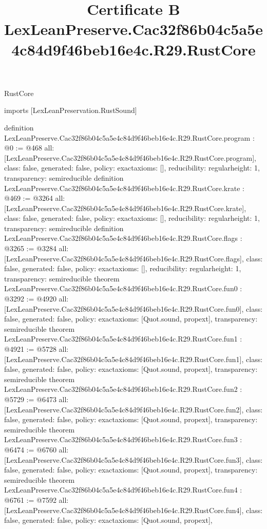 \begin{lexlean}{RustCore}
\title{Certificate B LexLeanPreserve.Cac32f86b04c5a5e4c84d9f46beb16e4c.R29.RustCore}
\begin{coremodule}
imports [LexLeanPreservation.RustSound]

definition LexLeanPreserve.Cac32f86b04c5a5e4c84d9f46beb16e4c.R29.RustCore.program : @0 := @468 {
  all: [LexLeanPreserve.Cac32f86b04c5a5e4c84d9f46beb16e4c.R29.RustCore.program],
  class: false,
  generated: false,
  policy: exact{axioms: []},
  reducibility: regular{height: 1},
  transparency: semireducible
}
definition LexLeanPreserve.Cac32f86b04c5a5e4c84d9f46beb16e4c.R29.RustCore.krate : @469 := @3264 {
  all: [LexLeanPreserve.Cac32f86b04c5a5e4c84d9f46beb16e4c.R29.RustCore.krate],
  class: false,
  generated: false,
  policy: exact{axioms: []},
  reducibility: regular{height: 1},
  transparency: semireducible
}
definition LexLeanPreserve.Cac32f86b04c5a5e4c84d9f46beb16e4c.R29.RustCore.flags : @3265 := @3284 {
  all: [LexLeanPreserve.Cac32f86b04c5a5e4c84d9f46beb16e4c.R29.RustCore.flags],
  class: false,
  generated: false,
  policy: exact{axioms: []},
  reducibility: regular{height: 1},
  transparency: semireducible
}
theorem LexLeanPreserve.Cac32f86b04c5a5e4c84d9f46beb16e4c.R29.RustCore.fun0 : @3292 := @4920 {
  all: [LexLeanPreserve.Cac32f86b04c5a5e4c84d9f46beb16e4c.R29.RustCore.fun0],
  class: false,
  generated: false,
  policy: exact{axioms: [Quot.sound, propext]},
  transparency: semireducible
}
theorem LexLeanPreserve.Cac32f86b04c5a5e4c84d9f46beb16e4c.R29.RustCore.fun1 : @4921 := @5728 {
  all: [LexLeanPreserve.Cac32f86b04c5a5e4c84d9f46beb16e4c.R29.RustCore.fun1],
  class: false,
  generated: false,
  policy: exact{axioms: [Quot.sound, propext]},
  transparency: semireducible
}
theorem LexLeanPreserve.Cac32f86b04c5a5e4c84d9f46beb16e4c.R29.RustCore.fun2 : @5729 := @6473 {
  all: [LexLeanPreserve.Cac32f86b04c5a5e4c84d9f46beb16e4c.R29.RustCore.fun2],
  class: false,
  generated: false,
  policy: exact{axioms: [Quot.sound, propext]},
  transparency: semireducible
}
theorem LexLeanPreserve.Cac32f86b04c5a5e4c84d9f46beb16e4c.R29.RustCore.fun3 : @6474 := @6760 {
  all: [LexLeanPreserve.Cac32f86b04c5a5e4c84d9f46beb16e4c.R29.RustCore.fun3],
  class: false,
  generated: false,
  policy: exact{axioms: [Quot.sound, propext]},
  transparency: semireducible
}
theorem LexLeanPreserve.Cac32f86b04c5a5e4c84d9f46beb16e4c.R29.RustCore.fun4 : @6761 := @7592 {
  all: [LexLeanPreserve.Cac32f86b04c5a5e4c84d9f46beb16e4c.R29.RustCore.fun4],
  class: false,
  generated: false,
  policy: exact{axioms: [Quot.sound, propext]},
}
\end{coremodule}
\end{lexlean}
